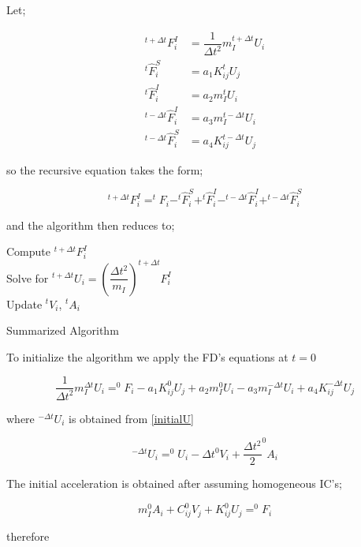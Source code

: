 Let;

\begin{equation}
\begin{aligned}
^{t+\Delta t} F_i^I&=\dfrac{1}{\Delta t^2} m_{I} ^{t+\Delta t}U_i\\
^{t} \hat{F}^S_i&=a_1 K_{ij} ^{t}U_j\\
^{t}\hat{F}_i^I&=a_2m_{I} ^{t}U_i\\
^{t-\Delta t}\hat{F}_i^I&=a_3m_{I} ^{t-\Delta t}U_i\\
^{t-\Delta t}\hat{F}_i^S&=a_4K_{ij}^{t-\Delta t}U_j
\end{aligned}
\label{forces2}
\end{equation}

so the recursive equation takes the form;

\begin{equation}
^{t+\Delta t} F_i^I=^{t}F_i-^{t} \hat{F}^S_i+^{t}\hat{F}_i^I-^{t-\Delta t}\hat{F}_i^I+^{t-\Delta t}\hat{F}_i^S
\label{forces3}
\end{equation}

and the algorithm then reduces to;

\begin{algorithm}[H]
\SetAlgoLined
{}
Compute $^{t+\Delta t} F_i^I$\\
Solve for $^{t+\Delta t}U_i=\left(\dfrac{\Delta t^2}{m_I}\right) ^{t+\Delta t}F_{i}^I$\\
Update $^{t}V_i$, $^{t}A_i$
\caption{Summarized Algorithm}
\end{algorithm}

To initialize the algorithm we apply the FD's equations at $t=0$

\[
\dfrac{1}{\Delta t^2}m_I ^{\Delta t}U_i=^{0}F_i-a_1 K_{ij} ^{0}U_j+a_2 m_I ^{0}U_i-a_3 m_I ^{-\Delta t} U_i+a_4 K_{ij} ^{-\Delta t} U_j
\]

where $^{-\Delta t} U_i$ is obtained from \eqref{initialU}

\begin{equation}
^{-\Delta t}U_i=^{0}U_i-\Delta t ^{0}V_i+\dfrac{\Delta t^2}{2} ^{0}A_i
\label{initialU2}
\end{equation}

The initial acceleration is obtained after assuming homogeneous IC's;

\[
m_{I} ^{0}A_i+C_{ij} ^{0}V_j +K_{ij} ^{0}U_j=^{0}F_i
\]

therefore

